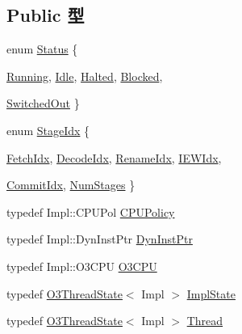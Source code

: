 \subsection*{Public 型}
\begin{DoxyCompactItemize}
\item 
enum \hyperlink{classFullO3CPU_a67a0db04d321a74b7e7fcfd3f1a3f70b}{Status} \{ \par
\hyperlink{classFullO3CPU_a67a0db04d321a74b7e7fcfd3f1a3f70ba2f5f2c4a8c4f4f0519d503dcdfbf55cb}{Running}, 
\hyperlink{classFullO3CPU_a67a0db04d321a74b7e7fcfd3f1a3f70bad3fa9ae9431d6cb1772f9d9df48cab19}{Idle}, 
\hyperlink{classFullO3CPU_a67a0db04d321a74b7e7fcfd3f1a3f70ba185a75df63e845aec97632afd6a34d6a}{Halted}, 
\hyperlink{classFullO3CPU_a67a0db04d321a74b7e7fcfd3f1a3f70ba9463ee9b8700258a1019b4b9d2d77a30}{Blocked}, 
\par
\hyperlink{classFullO3CPU_a67a0db04d321a74b7e7fcfd3f1a3f70ba2c25b24188e2b53c8706769167a82779}{SwitchedOut}
 \}
\item 
enum \hyperlink{classFullO3CPU_ad8ae6b222928fd7316fcf1f9f233353d}{StageIdx} \{ \par
\hyperlink{classFullO3CPU_ad8ae6b222928fd7316fcf1f9f233353da58acaf31e32cdcbea7664d3286a361f4}{FetchIdx}, 
\hyperlink{classFullO3CPU_ad8ae6b222928fd7316fcf1f9f233353da103b4435764d4d2723ba580aa798e258}{DecodeIdx}, 
\hyperlink{classFullO3CPU_ad8ae6b222928fd7316fcf1f9f233353daa1e6e6121c69679ec31ba66d1e1397a4}{RenameIdx}, 
\hyperlink{classFullO3CPU_ad8ae6b222928fd7316fcf1f9f233353dae8242e5f6fe07d4611f47d1908eb01ad}{IEWIdx}, 
\par
\hyperlink{classFullO3CPU_ad8ae6b222928fd7316fcf1f9f233353dab4e6ff6a24d7c325f21753fe2a827048}{CommitIdx}, 
\hyperlink{classFullO3CPU_ad8ae6b222928fd7316fcf1f9f233353dad4d98708d468a3805751e2e5d21b0fea}{NumStages}
 \}
\item 
typedef Impl::CPUPol \hyperlink{classFullO3CPU_a622513cd9a0b12a706b26c3320585f92}{CPUPolicy}
\item 
typedef Impl::DynInstPtr \hyperlink{classFullO3CPU_a028ce10889c5f6450239d9e9a7347976}{DynInstPtr}
\item 
typedef Impl::O3CPU \hyperlink{classFullO3CPU_a44622cf06940413482836cb62931ac3f}{O3CPU}
\item 
typedef \hyperlink{structO3ThreadState}{O3ThreadState}$<$ Impl $>$ \hyperlink{classFullO3CPU_a19d73166363cbf2e4ed0ddec44afa8d4}{ImplState}
\item 
typedef \hyperlink{structO3ThreadState}{O3ThreadState}$<$ Impl $>$ \hyperlink{classFullO3CPU_ad5e0f9b655492f45720f8d756f11d3b5}{Thread}

\end{DoxyCompactItemize}

